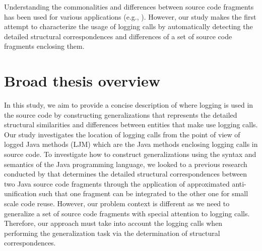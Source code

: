 Understanding the commonalities and differences between source code fragments has been used for various applications (e.g., \cite{cottrell2007determining, cottrell2008semi, cottrell2009compare, cossette2014using, bulychev2009evaluation}). However, our study makes the first attempt to characterize the usage of logging calls by automatically detecting the detailed structural correspondences and differences of a set of  source code fragments enclosing them. 



\section{Broad thesis overview} \label{intro-overview}

In this study, we aim to provide a concise description of where logging is used in the source code by constructing generalizations that represents the detailed structural similarities and differences between entities that make use logging calls. Our study investigates the location of logging calls from the point of view of logged Java methods (LJM) which are the Java methods enclosing logging calls in source code. To investigate how to construct generalizations using the syntax and semantics of the Java programming language, we looked to a previous research conducted by \citet{cottrell2008semi} that determines the detailed structural correspondences between two Java source code fragments through the application of approximated anti-unification such that one fragment can be integrated to the other one for small scale code reuse. However, our problem context is different as we need to generalize a set of source code fragments with special attention to logging calls. Therefore, our approach must take into account the logging calls when performing the generalization task via the determination of structural correspondences. 


